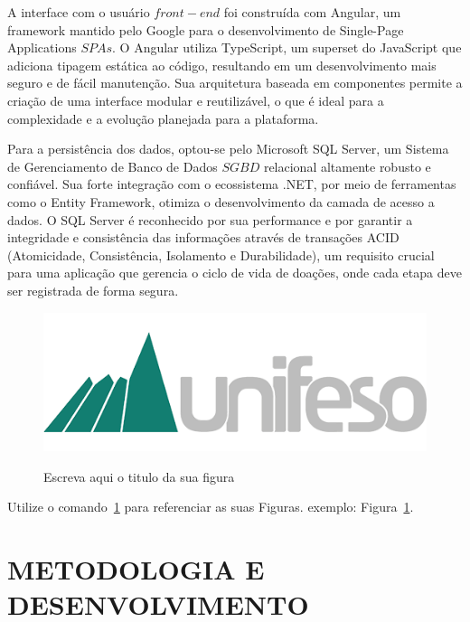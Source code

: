\documentclass[
	12pt,				%
	openright,			%
	oneside,			%
	a4paper,			%
	english,			%
	brazil				%
	]{abntex2}
\theoremstyle{definition}
\begin{document}
A interface com o usuário \(front-end\) foi construída com Angular, um framework mantido pelo Google para o desenvolvimento de Single-Page Applications \(SPAs\). O Angular utiliza TypeScript, um superset do JavaScript que adiciona tipagem estática ao código, resultando em um desenvolvimento mais seguro e de fácil manutenção. Sua arquitetura baseada em componentes permite a criação de uma interface modular e reutilizável, o que é ideal para a complexidade e a evolução planejada para a plataforma.

Para a persistência dos dados, optou-se pelo Microsoft SQL Server, um Sistema de Gerenciamento de Banco de Dados \(SGBD\) relacional altamente robusto e confiável. Sua forte integração com o ecossistema .NET, por meio de ferramentas como o Entity Framework, otimiza o desenvolvimento da camada de acesso a dados. O SQL Server é reconhecido por sua performance e por garantir a integridade e consistência das informações através de transações ACID (Atomicidade, Consistência, Isolamento e Durabilidade), um requisito crucial para uma aplicação que gerencia o ciclo de vida de doações, onde cada etapa deve ser registrada de forma segura.

\begin{figure}[!h]
\centering
\caption{Escreva aqui o titulo da sua figura}
\includegraphics[scale=0.5]{UNIFESO.png} %
\label{unifeso}%
\end{figure}

Utilize o comando~\ref{unifeso} para referenciar as suas Figuras.
exemplo: Figura~\ref{unifeso}.

\chapter[METODOLOGIA E DESENVOLVIMENTO]{METODOLOGIA E DESENVOLVIMENTO}
\end{document}
